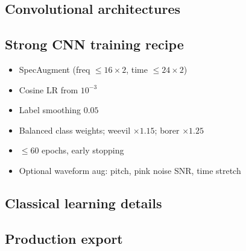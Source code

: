 \subsection{Convolutional architectures}

\subsection{Strong CNN training recipe}
\begin{itemize}[leftmargin=*]
  \item SpecAugment (freq $\le 16\times2$, time $\le 24\times2$)
  \item Cosine LR from $10^{-3}$
  \item Label smoothing $0.05$
  \item Balanced class weights; weevil $\times 1.15$; borer $\times 1.25$
  \item $\le 60$ epochs, early stopping
  \item Optional waveform aug: pitch, pink noise SNR, time stretch
\end{itemize}

\subsection{Classical learning details}

\subsection{Production export}
